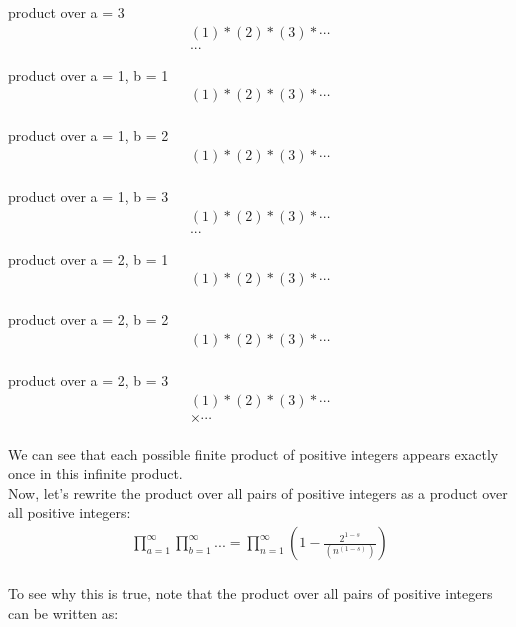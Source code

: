 \documentclass{article}
\begin{document}
product over a = 3 
\begin{align*}
(1) * (2) * (3) * \cdots \\
...
\end{align*}

product over a = 1, b = 1
\begin{align*}
(1) * (2) * (3) * \cdots \\
\end{align*}

product over a = 1, b = 2 \\
\begin{align*}
(1) * (2) * (3) * \cdots \\
\end{align*}

product over a = 1, b = 3 
\begin{align*}
(1) * (2) * (3) * \cdots \\
...
\end{align*}

product over a = 2, b = 1 
\begin{align*}
(1) * (2) * (3) * \cdots \\
\end{align*}

product over a = 2, b = 2
\begin{align*}
(1) * (2) * (3) * \cdots \\
\end{align*}

product over a = 2, b = 3 
\begin{align*}
(1) * (2) * (3) * \cdots \\
\times \cdots \\
\end{align*}

We can see that each possible finite product of positive integers appears exactly once in this infinite product. \\

Now, let's rewrite the product over all pairs of positive integers as a product over all positive integers: \\

\begin{align*}
\prod_{a=1}^\infty \prod_{b=1}^\infty ... = \prod_{n=1}^\infty \left(1 - \frac{2^{1-s}}{\left(n^\left(1-s\right)\right)}\right) \\
\end{align*}

To see why this is true, note that the product over all pairs of positive integers can be written as: \\
\end{document}
